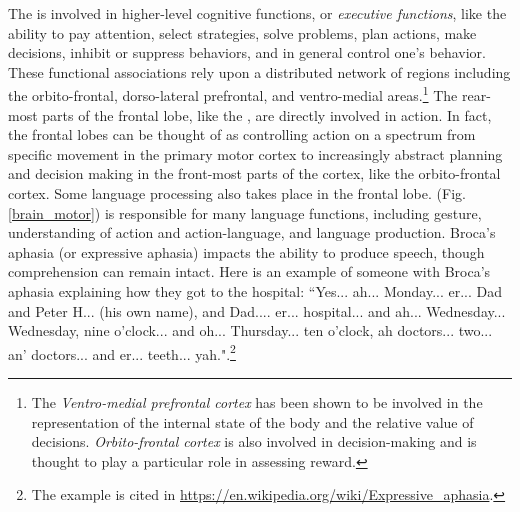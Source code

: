 The  is involved in higher-level cognitive functions, or \emph{executive functions}, like the ability to pay attention, select strategies, solve problems, plan actions, make decisions, inhibit or suppress behaviors, and in general control one's behavior. These functional associations rely upon a distributed network of regions including the orbito-frontal, dorso-lateral prefrontal, and ventro-medial areas.\footnote{The \emph{Ventro-medial prefrontal cortex} has been shown to be involved in the representation of the internal state of the body and the relative value of decisions. \emph{Orbito-frontal cortex} is also involved in decision-making and is thought to play a particular role in assessing reward.} The rear-most parts of the frontal lobe, like the , are directly involved in action. In fact, the frontal lobes can be thought of as controlling action on a spectrum from specific movement in the primary motor cortex to  increasingly abstract planning and decision making in the front-most parts of the cortex, like the orbito-frontal cortex. Some language processing also takes place in the frontal lobe.  (Fig. \ref{brain_motor}) is responsible for many language functions, including gesture, understanding of action and action-language, and language production. Broca's aphasia (or expressive aphasia) impacts the ability to produce speech, though comprehension can remain intact. Here is an example of someone with Broca's aphasia explaining how they got to the hospital: ``Yes... ah... Monday... er... Dad and Peter H... (his own name), and Dad.... er... hospital... and ah... Wednesday... Wednesday, nine o'clock... and oh... Thursday... ten o'clock, ah doctors... two... an' doctors... and er... teeth... yah."\cite{goodglass1976language}.\footnote{The example is cited in \url{https://en.wikipedia.org/wiki/Expressive_aphasia}.}

